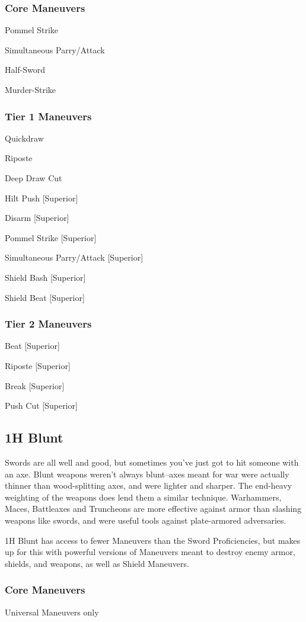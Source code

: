 \documentclass[oneside,11pt,english]{book}
\begin{document}
\subsubsection{Core Maneuvers}
Pommel Strike

Simultaneous Parry/Attack

Half-Sword

Murder-Strike

\subsubsection{Tier 1 Maneuvers}
Quickdraw

Riposte

Deep Draw Cut

Hilt Push [Superior]

Disarm [Superior]

Pommel Strike [Superior]

Simultaneous Parry/Attack [Superior]

Shield Bash [Superior]

Shield Beat [Superior]

\subsubsection{Tier 2 Maneuvers}
Beat [Superior]

Riposte [Superior]

Break [Superior]

Push Cut [Superior]

\subsection{1H Blunt}
Swords are all well and good, but sometimes you’ve just got to hit someone with an axe. Blunt 
weapons weren’t always blunt--axes meant for war were actually thinner than wood-splitting axes, and 
were lighter and sharper. The end-heavy weighting of the weapons does lend them a similar technique. 
Warhammers, Maces, Battleaxes and Truncheons are more effective against armor than slashing weapons 
like swords, and were useful tools against plate-armored adversaries. 

1H Blunt has access to fewer Maneuvers than the Sword Proficiencies, but makes up for this with 
powerful versions of Maneuvers meant to destroy enemy armor, shields, and weapons, as well as Shield 
Maneuvers.

\subsubsection{Core Maneuvers}
Universal Maneuvers only
\end{document}

